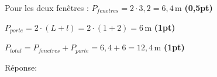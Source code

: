\begin{parts}
\begin{solutionorgrid}[180pt]
\vspace{5pt}
Pour les deux fenêtres : $P_{fenetres} = 2\cdot 3,2 = 6,4\,\text{m}$ \hfill \textbf{(0,5pt)}

\vspace{5pt}
$P_{porte} = 2 \cdot (L + l) = 2\cdot(1+2) = 6\,\text{m}$ \hfill \textbf{(1pt)}

\vspace{5pt}
$P_{total} = P_{fenetres} + P_{porte} =  6,4 + 6 = 12,4\,\text{m}$ \hfill \textbf{(1pt)}
\end{solutionorgrid}

\begin{tcolorbox}[enhanced jigsaw, interior hidden, colframe=box, parbox=false]%
Réponse: 
\end{tcolorbox}
\end{parts}
